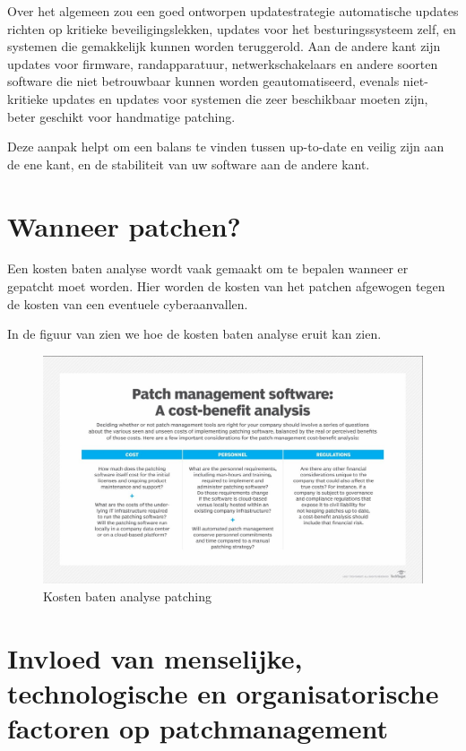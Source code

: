 Over het algemeen zou een goed ontworpen updatestrategie automatische updates richten op kritieke beveiligingslekken, updates voor het besturingssysteem zelf, en systemen die gemakkelijk kunnen worden teruggerold. Aan de andere kant zijn updates voor firmware, randapparatuur, netwerkschakelaars en andere soorten software die niet betrouwbaar kunnen worden geautomatiseerd, evenals niet-kritieke updates en updates voor systemen die zeer beschikbaar moeten zijn, beter geschikt voor handmatige patching.

Deze aanpak helpt om een balans te vinden tussen up-to-date en veilig zijn aan de ene kant, en de stabiliteit van uw software aan de andere kant.

\section{Wanneer patchen?}
Een kosten baten analyse wordt vaak gemaakt om te bepalen wanneer er gepatcht moet worden. Hier worden de kosten van het patchen afgewogen tegen de kosten van een eventuele cyberaanvallen.

In de figuur van \textcite{Posey2024} zien we hoe de kosten baten analyse eruit kan zien.

\begin{figure}[htbp]
    \centering
    \includegraphics[width=\textwidth]{techtarget.jpg}
    \caption{Kosten baten analyse patching \autocite{Posey2024}}
    \label{fig:kostenbaten}
\end{figure}


\section{Invloed van menselijke, technologische en organisatorische factoren op patchmanagement}

